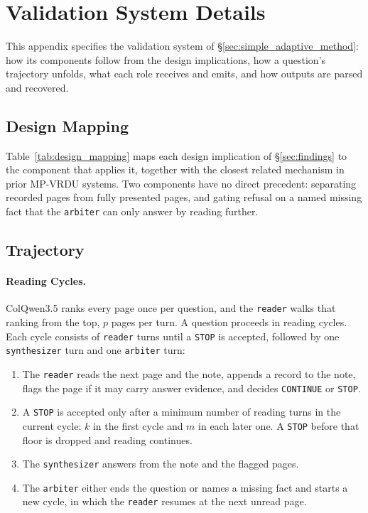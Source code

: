 \section{Validation System Details}
\label{app:val_system_details}

This appendix specifies the validation system of \S\ref{sec:simple_adaptive_method}: how its components follow from the design implications, how a question's trajectory unfolds, what each role receives and emits, and how outputs are parsed and recovered.

\subsection{Design Mapping}
\label{app:design_mapping}



Table~\ref{tab:design_mapping} maps each design implication of \S\ref{sec:findings} to the component that applies it, together with the closest related mechanism in prior MP-VRDU systems. Two components have no direct precedent: separating recorded pages from fully presented pages, and gating refusal on a named missing fact that the \texttt{arbiter} can only answer by reading further.

\subsection{Trajectory}
\label{app:trajectory}

\paragraph{Reading Cycles.}
ColQwen3.5 ranks every page once per question, and the \texttt{reader} walks that ranking from the top, $p$ pages per turn. A question proceeds in reading cycles. Each cycle consists of \texttt{reader} turns until a \texttt{STOP} is accepted, followed by one \texttt{synthesizer} turn and one \texttt{arbiter} turn:
\begin{enumerate}
\item The \texttt{reader} reads the next page and the note, appends a record to the note, flags the page if it may carry answer evidence, and decides \texttt{CONTINUE} or \texttt{STOP}.
\item A \texttt{STOP} is accepted only after a minimum number of reading turns in the current cycle: $k$ in the first cycle and $m$ in each later one. A \texttt{STOP} before that floor is dropped and reading continues.
\item The \texttt{synthesizer} answers from the note and the flagged pages.
\item The \texttt{arbiter} either ends the question or names a missing fact and starts a new cycle, in which the \texttt{reader} resumes at the next unread page.
\end{enumerate}

